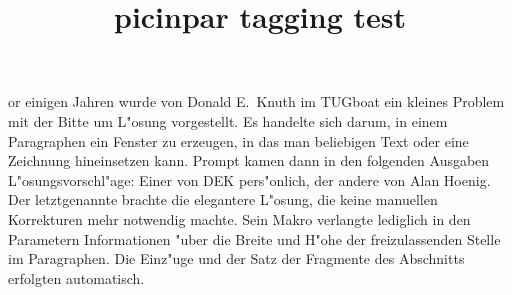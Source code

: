 \documentclass{article}
\title{picinpar tagging test}
\begin{document}
\begin{window}[0,l,{\yn V},{}]
or einigen Jahren wurde von Donald E.~Knuth im TUGboat ein kleines
Problem mit der Bitte um L"osung vorgestellt. Es handelte sich darum,
in einem Paragraphen ein Fenster zu erzeugen, in das man beliebigen Text
oder eine Zeichnung hineinsetzen kann. Prompt kamen dann in den folgenden
Ausgaben L"osungsvorschl"age: Einer von DEK pers"onlich, der andere von
Alan Hoenig. Der letztgenannte brachte die elegantere L"osung, die keine
manuellen Korrekturen mehr notwendig machte. Sein Makro verlangte lediglich
in den Parametern Informationen "uber die Breite und H"ohe der
freizulassenden Stelle im Paragraphen. Die Einz"uge und der Satz der
Fragmente des Abschnitts erfolgten automatisch.
\end{window}
\end{document}
